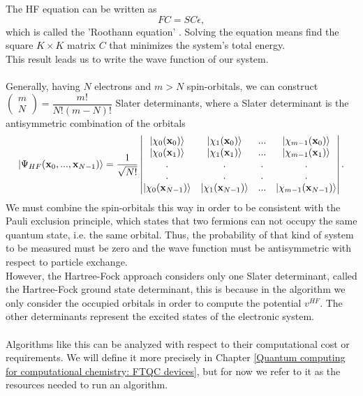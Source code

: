 The HF equation can be written as
\begin{equation}
    FC = SC\epsilon,
\end{equation}
which is called the 'Roothann equation' \cite{Shikano2021Jun}. Solving the equation means find the square $K\times K$ matrix $C$ that minimizes the system's total energy. \\
This result leads us to write the wave function of our system. \\
\\
Generally, having $N$ electrons and $m>N$ spin-orbitals, we can construct \\
$\left( \begin{array}{c} m \\ N \end{array} \right) = \dfrac{m!}{N!(m-N)!}$ Slater determinants, where a Slater determinant is the antisymmetric combination of the orbitals
\begin{equation}
|\Psi_{HF}({\bf x}_0, ..., {\bf x}_{N-1})\rangle =
\frac1{\sqrt{N!}}
\begin{vmatrix}
    |\chi_{0}({\bf x}_0)\rangle & |\chi_{1}({\bf x}_0)\rangle & ... & |\chi_{m-1}({\bf x}_0)\rangle\\ 
    |\chi_{0}({\bf x}_1)\rangle & |\chi_{1}({\bf x}_1)\rangle & ... & |\chi_{m-1}({\bf x}_1)\rangle\\
    . & . & . & . \\
    . & . & . & . \\
    |\chi_{0}({\bf x}_{N-1})\rangle & |\chi_{1}({\bf x}_{N-1})\rangle & ... & |\chi_{m-1}({\bf x}_{N-1})\rangle
\end{vmatrix}.
\end{equation}
We must combine the spin-orbitals this way in order to be consistent with the Pauli exclusion principle, which states that two fermions can not occupy the same quantum state, i.e. the same orbital. Thus, the probability of that kind of system to be measured must be zero and the wave function must be antisymmetric with respect to particle exchange. \\
However, the Hartree-Fock approach considers only one Slater determinant, called the Hartree-Fock ground state determinant, this is because in the algorithm we only consider the occupied orbitals in order to compute the potential $v^{HF}$. The other determinants represent the excited states of the electronic system. \\
\\
Algorithms like this can be analyzed with respect to their computational cost or requirements. We will define it more precisely in Chapter \ref{Quantum computing for computational chemistry: FTQC devices}, but for now we refer to it as the resources needed to run an algorithm. \\
